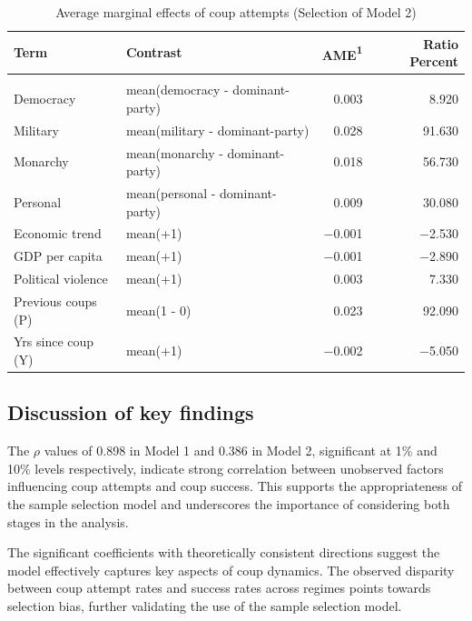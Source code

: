 \documentclass[
  12pt,
]{report}
\begin{document}
\begin{longtable}[]{@{}llrr@{}}

\caption{\label{tbl-mfx2}Average marginal effects of coup attempts
(Selection of Model 2)}

\tabularnewline

\toprule\noalign{}
Term & Contrast & AME{\textsuperscript{1}} & Ratio Percent \\
\midrule\noalign{}
\endhead
\midrule\noalign{}
\multicolumn{4}{@{}l@{}}{%
{\textsuperscript{1}} AME: Average Marginal Effect} \\
\bottomrule\noalign{}
\endlastfoot
Democracy & mean(democracy - dominant-party) & 0.003 & 8.920 \\
Military & mean(military - dominant-party) & 0.028 & 91.630 \\
Monarchy & mean(monarchy - dominant-party) & 0.018 & 56.730 \\
Personal & mean(personal - dominant-party) & 0.009 & 30.080 \\
Economic trend & mean(+1) & −0.001 & −2.530 \\
GDP per capita & mean(+1) & −0.001 & −2.890 \\
Political violence & mean(+1) & 0.003 & 7.330 \\
Previous coups (P) & mean(1 - 0) & 0.023 & 92.090 \\
Yrs since coup (Y) & mean(+1) & −0.002 & −5.050 \\

\end{longtable}

\subsection{Discussion of key
findings}\label{discussion-of-key-findings}

The \(\rho\) values of 0.898 in Model 1 and 0.386 in Model 2,
significant at 1\% and 10\% levels respectively, indicate strong
correlation between unobserved factors influencing coup attempts and
coup success. This supports the appropriateness of the sample selection
model and underscores the importance of considering both stages in the
analysis.

The significant coefficients with theoretically consistent directions
suggest the model effectively captures key aspects of coup dynamics. The
observed disparity between coup attempt rates and success rates across
regimes points towards selection bias, further validating the use of the
sample selection model.
\end{document}
